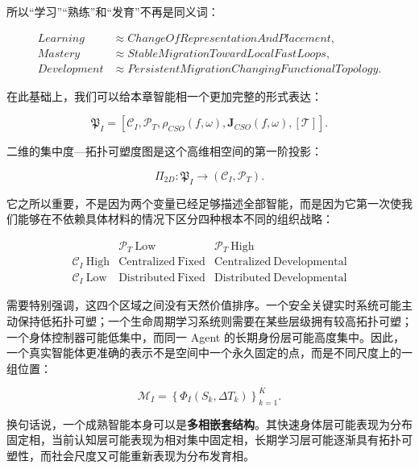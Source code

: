 所以“学习”“熟练”和“发育”不再是同义词：

\begin{align}
Learning
&\approx
ChangeOfRepresentationAndPlacement,
\\
Mastery
&\approx
StableMigrationTowardLocalFastLoops,
\\
Development
&\approx
PersistentMigrationChangingFunctionalTopology.
\end{align}

在此基础上，我们可以给本章智能相一个更加完整的形式表达：

\begin{equation}
\boxed{
\mathfrak{P}_I
=
\left[
\mathcal{C}_I,
\mathcal{P}_T,
\rho_{CSO}(f,\omega),
\mathbf{J}_{CSO}(f,\omega),
[\mathcal{T}]
\right].
}
\end{equation}

二维的集中度—拓扑可塑度图是这个高维相空间的第一阶投影：

\begin{equation}
\Pi_{2D}:
\mathfrak{P}_I
\rightarrow
(\mathcal{C}_I,\mathcal{P}_T).
\end{equation}

它之所以重要，不是因为两个变量已经足够描述全部智能，而是因为它第一次使我们能够在不依赖具体材料的情况下区分四种根本不同的组织战略：

\begin{equation}
\begin{array}{c|c|c}
 & \mathcal{P}_T\ \mathrm{Low} & \mathcal{P}_T\ \mathrm{High}
\\
\hline
\mathcal{C}_I\ \mathrm{High}
&
\mathrm{Centralized\ Fixed}
&
\mathrm{Centralized\ Developmental}
\\
\mathcal{C}_I\ \mathrm{Low}
&
\mathrm{Distributed\ Fixed}
&
\mathrm{Distributed\ Developmental}
\end{array}
\end{equation}

需要特别强调，这四个区域之间没有天然价值排序。一个安全关键实时系统可能主动保持低拓扑可塑；一个生命周期学习系统则需要在某些层级拥有较高拓扑可塑；一个身体控制器可能低集中，而同一 Agent 的长期身份层可能高度集中。因此，一个真实智能体更准确的表示不是空间中一个永久固定的点，而是不同尺度上的一组位置：

\begin{equation}
\mathcal{M}_{I}
=
\left\{
\Phi_I(S_k,\Delta T_k)
\right\}_{k=1}^{K}.
\end{equation}

换句话说，一个成熟智能本身可以是\textbf{多相嵌套结构}。其快速身体层可能表现为分布固定相，当前认知层可能表现为相对集中固定相，长期学习层可能逐渐具有拓扑可塑性，而社会尺度又可能重新表现为分布发育相。

